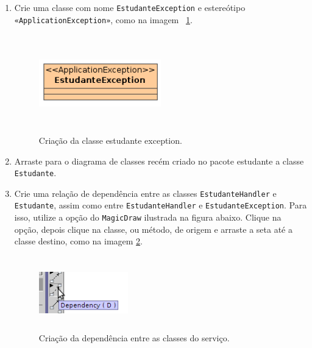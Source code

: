 \begin{enumerate}
\item Crie uma classe com nome \texttt{EstudanteException} e estereótipo
\texttt{«ApplicationException»}, como na imagem ~\ref{cria_estudante_exception}.
\begin{figure}[H]
	\centering
	\includegraphics[width=150pt,height=120pt]{imgs/tutorial-mdarte-0010.png}
	\caption{Criação da classe estudante exception.}
	\label{cria_estudante_exception}
\end{figure}
	
\item Arraste para o diagrama de classes recém criado no pacote estudante a
classe \texttt{Estudante}.
	
\item Crie uma relação de dependência entre as classes \texttt{EstudanteHandler}
e \texttt{Estudante}, assim como entre \texttt{EstudanteHandler} e
\texttt{EstudanteException}. Para isso, utilize a opção do \texttt{MagicDraw}
ilustrada na figura abaixo. Clique na opção, depois clique na classe, ou método,
de origem e arraste a seta até a classe destino, como na imagem
\ref{cria_dependencia_servico}.

\begin{figure}[H]
	\centering
	\includegraphics[width=110pt,height=90pt]{imgs/tutorial-mdarte-0012.png}
	\caption{Criação da dependência entre as classes do serviço.}
	\label{cria_dependencia_servico}
\end{figure}


\end{enumerate}
